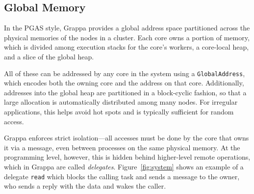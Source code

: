 \subsection{Global Memory}
In the PGAS style, Grappa provides a global address space partitioned across the physical memories of the nodes in a cluster. Each core owns a portion of memory, which is divided among execution stacks for the core's workers, a core-local heap, and a slice of the global heap.

All of these can be addressed by any core in the system using a \texttt{GlobalAddress}, which encodes both the owning core and the address on that core. Additionally, addresses into the global heap are partitioned in a block-cyclic fashion, so that a large allocation is automatically distributed among many nodes. For irregular applications, this helps avoid hot spots and is typically sufficient for random access.

Grappa enforces strict isolation---all accesses must be done by the core that owns it via a message, even between processes on the same physical memory. At the programming level, however, this is hidden behind higher-level remote operations, which in Grappa are called \emph{delegates}. Figure~\ref{fig:system} shows an example of a delegate \texttt{read} which blocks the calling task and sends a message to the owner, who sends a reply with the data and wakes the caller.

